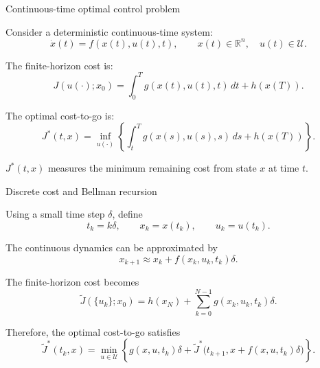 \documentclass[aspectratio=169]{beamer}
\begin{document}
\begin{frame}{Continuous-time optimal control problem}

Consider a deterministic continuous-time system:
\[
\dot{x}(t)=f(x(t),u(t),t),
\qquad
x(t)\in\mathbb{R}^n,\quad u(t)\in\mathcal U .
\]

\vspace{0.25cm}

The finite-horizon cost is:
\[
J(u(\cdot);x_0)
=
\int_0^T g(x(t),u(t),t)\,dt+h(x(T)).
\]

\vspace{0.25cm}

The optimal cost-to-go is:
\[
J^*(t,x)
=
\inf_{u(\cdot)}
\left\{
\int_t^T g(x(s),u(s),s)\,ds+h(x(T))
\right\}.
\]

\vspace{0.15cm}


$J^*(t,x)$ measures the minimum remaining cost from state $x$ at time $t$.


\end{frame}

\begin{frame}{Discrete cost and Bellman recursion}

Using a small time step $\delta$, define
\[
t_k=k\delta,\qquad x_k=x(t_k),\qquad u_k=u(t_k).
\]

The continuous dynamics can be approximated by
\[
x_{k+1}
\approx
x_k+f(x_k,u_k,t_k)\delta .
\]

\vspace{0.1cm}

The finite-horizon cost becomes
\[
\tilde J(\{u_k\};x_0)
=
h(x_N)
+
\sum_{k=0}^{N-1}
g(x_k,u_k,t_k)\delta .
\]

\vspace{0.1cm}

Therefore, the optimal cost-to-go satisfies
\[
\tilde{J}^*(t_k,x)
=
\min_{u\in\mathcal U}
\left\{
g(x,u,t_k)\delta
+
\tilde{J}^*
\bigl(t_{k+1},x+f(x,u,t_k)\delta\bigr)
\right\}.
\]

\vspace{0.1cm}



\end{frame}
\end{document}
